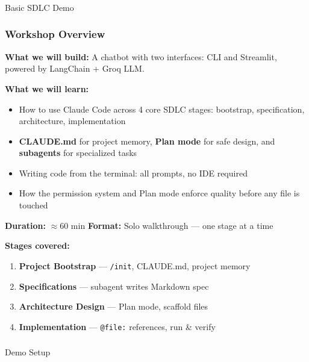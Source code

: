 \begin{frame}[fragile]\frametitle{}

\begin{center}
{\Large Basic SDLC Demo}
\end{center}
\end{frame}

\begin{frame}[fragile]\frametitle{Workshop Overview}
\textbf{What we will build:} A chatbot with two interfaces: CLI and Streamlit, powered by LangChain + Groq LLM.

\textbf{What we will learn:}
  \begin{itemize}
    \item How to use Claude Code across 4 core SDLC stages: bootstrap, specification, architecture, implementation
    \item \textbf{CLAUDE.md} for project memory, \textbf{Plan mode} for safe design, and \textbf{subagents} for specialized tasks
    \item Writing code from the terminal: all prompts, no IDE required
    \item How the permission system and Plan mode enforce quality before any file is touched
  \end{itemize}

\textbf{Duration:} $\approx$60 min \quad \textbf{Format:} Solo walkthrough --- one stage at a time

\textbf{Stages covered:}
  \begin{enumerate}
    \item \textbf{Project Bootstrap} --- \texttt{/init}, CLAUDE.md, project memory
    \item \textbf{Specifications} --- subagent writes Markdown spec
    \item \textbf{Architecture Design} --- Plan mode, scaffold files
    \item \textbf{Implementation} --- \texttt{@file:} references, run \& verify
  \end{enumerate}
\end{frame}


\begin{frame}[fragile]\frametitle{}
\begin{center}
{\Large Demo Setup}
\end{center}
\end{frame}

